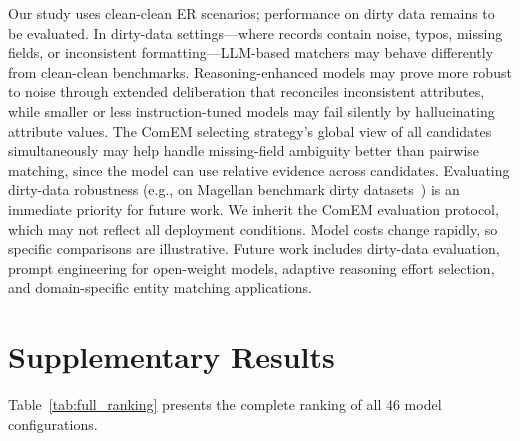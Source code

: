 \documentclass[runningheads]{llncs}
\begin{document}
Our study uses clean-clean ER scenarios; performance on dirty data remains to be evaluated. In dirty-data settings---where records contain noise, typos, missing fields, or inconsistent formatting---LLM-based matchers may behave differently from clean-clean benchmarks. Reasoning-enhanced models may prove more robust to noise through extended deliberation that reconciles inconsistent attributes, while smaller or less instruction-tuned models may fail silently by hallucinating attribute values. The ComEM selecting strategy's global view of all candidates simultaneously may help handle missing-field ambiguity better than pairwise matching, since the model can use relative evidence across candidates. Evaluating dirty-data robustness (e.g., on Magellan benchmark dirty datasets~\cite{mudgal2018deep}) is an immediate priority for future work. We inherit the ComEM evaluation protocol, which may not reflect all deployment conditions. Model costs change rapidly, so specific comparisons are illustrative. Future work includes dirty-data evaluation, prompt engineering for open-weight models, adaptive reasoning effort selection, and domain-specific entity matching applications.




\appendix

\section{Supplementary Results}
\label{sec:full_ranking}

Table~\ref{tab:full_ranking} presents the complete ranking of all 46 model configurations.
\end{document}
